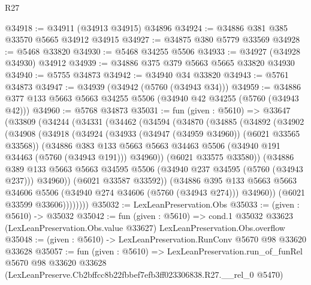 \begin{lexlean}{R27}
\begin{coremodule}
@34918 := @34911 (@34913 @34915) @34896
@34924 := @34886 @381 @385 @33570 @5665 @34912 @34915
@34927 := @34875 @380 @5779 @33569
@34928 := @5468 @33820
@34930 := @5468 @34255 @5506
@34933 := @34927 (@34928 @34930) @34912
@34939 := @34886 @375 @379 @5663 @5665 @33820 @34930
@34940 := @5755 @34873
@34942 := @34940 @34 @33820
@34943 := @5761 @34873
@34947 := @34939 (@34942 (@5760 (@34943 @34)))
@34959 := @34886 @377 @133 @5663 @5663 @34255 @5506 (@34940 @42 @34255 (@5760 (@34943 @42)))
@34960 := @5768 @34873
@35031 := fun (given : @5610) =>
  @33647
    (@33809
      (@34244
        (@34331
          (@34462
            (@34594
              (@34870
                (@34885
                  (@34892
                    (@34902
                      (@34908
                        (@34918
                          (@34924
                            (@34933 (@34947 (@34959 @34960)) (@6021 @33565 @33568))
                            (@34886
                              @383
                              @133
                              @5663
                              @5663
                              @34463
                              @5506
                              (@34940 @191 @34463 (@5760 (@34943 @191)))
                              @34960))
                          (@6021 @33575 @33580))
                        (@34886
                          @389
                          @133
                          @5663
                          @5663
                          @34595
                          @5506
                          (@34940 @237 @34595 (@5760 (@34943 @237)))
                          @34960))
                      (@6021 @33587 @33592))
                    (@34886
                      @395
                      @133
                      @5663
                      @5663
                      @34606
                      @5506
                      (@34940 @274 @34606 (@5760 (@34943 @274)))
                      @34960))
                  (@6021 @33599 @33606))))))))
@35032 := LexLeanPreservation.Obs
@35033 := (given : @5610) -> @35032
@35042 := fun (given : @5610) =>
  cond.{1} @35032 @33623 (LexLeanPreservation.Obs.value @33627) LexLeanPreservation.Obs.overflow
@35048 := (given : @5610) -> LexLeanPreservation.RunConv @5670 @98 @33620 @33628
@35057 := fun (given : @5610) =>
  LexLeanPreservation.run_of_funRel
    @5670
    @98
    @33620
    @33628
    (LexLeanPreserve.Cb2bffcc8b22fbbef7efb3ff023306838.R27.__rel_0 @5470)
\end{coremodule}
\end{lexlean}
